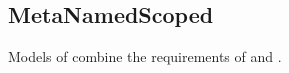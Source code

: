 \subsection{MetaNamedScoped}
\label{concept-MetaNamedScoped}

Models of  combine the requirements of  and .

